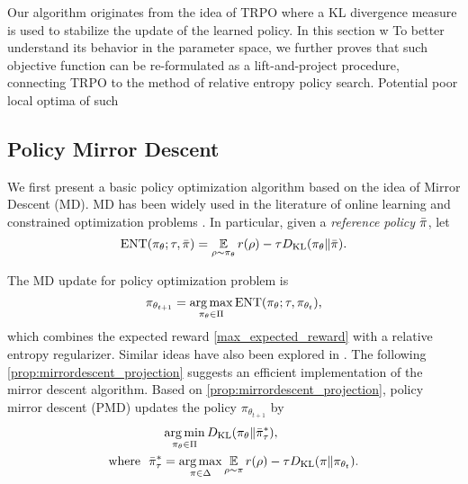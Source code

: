 Our algorithm originates from the idea of TRPO where a KL divergence measure is used to stabilize the update of the learned policy. 
In this section w
To better understand its behavior in the parameter space, we further proves that such objective function can be re-formulated as a lift-and-project procedure, connecting TRPO to the method of relative entropy policy search.
Potential poor local optima of such 

\subsection{Policy Mirror Descent}
\label{sec:pmd}
We first present a basic policy optimization algorithm based on the idea of Mirror Descent (MD). MD has been widely used in the literature of online learning and constrained optimization problems \citep{nemirovskii1983problem,beck2003mirror}. In particular, given a \emph{reference policy} $\bar{\pi}$, let 
\begin{equation*}
\text{ENT}(\pi_\theta; \tau, \bar{\pi}) = { \operatorname*{\mathbb{E}}\limits_{\rho \sim \pi_\theta}{  r(\rho)  - \tau D_{\mathrm{KL}}(\pi_\theta \| \bar{\pi}) } }.
\end{equation*}

The MD update for policy optimization problem is 
\begin{equation}
\pi_{\theta_{t+1}} = \operatorname*{arg\,max}\limits_{\pi_\theta \in \Pi}  \text{ENT}(\pi_\theta; \tau, \pi_{\theta_t}), 
\end{equation}
which combines the expected reward \cref{max_expected_reward} with a relative entropy regularizer. Similar ideas have also been explored in \citet{peters2007reinforcement,wierstra2008episodic,peters2010relative,schulman2015trust,montgomery2016guided,nachum2017trust,haarnoja2018soft,abdolmaleki2018maximum}. The following \cref{prop:mirrordescent_projection} suggests an efficient implementation of the mirror descent algorithm.
Based on \cref{prop:mirrordescent_projection}, policy mirror descent (PMD) updates the policy $\pi_{\theta_{t+1}}$ by
\begin{equation}
\label{eq:pmd}
\begin{split}
&\operatorname*{arg\,min}\limits_{\pi_\theta \in \Pi}{D_{\mathrm{KL}}( \pi_\theta \| \bar{\pi}_{\tau}^* )}, \\
\text{where}\ \ \bar{\pi}_{\tau}^* & =  \operatorname*{arg\,max}\limits_{\pi \in \Delta}{ \operatorname*{\mathbb{E}}\limits_{\rho \sim \pi}{  r(\rho)  - \tau D_{\mathrm{KL}}(\pi \| \pi_{\theta_t}) } }.
\end{split}
\end{equation}
\fi

